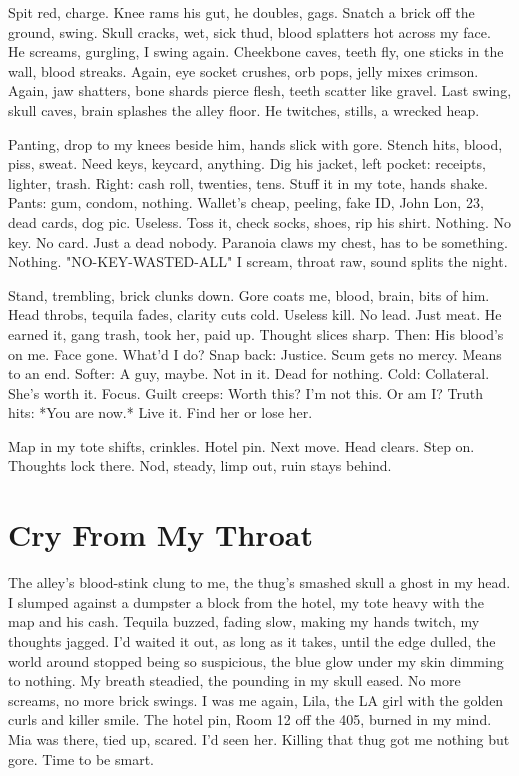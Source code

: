 \documentclass{article}
\begin{document}
Spit red, charge. Knee rams his gut, he doubles, gags. Snatch a brick off the ground, swing. Skull cracks, wet, sick thud, blood splatters hot across my face. He screams, gurgling, I swing again. Cheekbone caves, teeth fly, one sticks in the wall, blood streaks. Again, eye socket crushes, orb pops, jelly mixes crimson. Again, jaw shatters, bone shards pierce flesh, teeth scatter like gravel. Last swing, skull caves, brain splashes the alley floor. He twitches, stills, a wrecked heap.

Panting, drop to my knees beside him, hands slick with gore. Stench hits, blood, piss, sweat. Need keys, keycard, anything. Dig his jacket, left pocket: receipts, lighter, trash. Right: cash roll, twenties, tens. Stuff it in my tote, hands shake. Pants: gum, condom, nothing. Wallet's cheap, peeling, fake ID, John Lon, 23, dead cards, dog pic. Useless. Toss it, check socks, shoes, rip his shirt. Nothing. No key. No card. Just a dead nobody. Paranoia claws my chest, has to be something. Nothing. "NO-KEY-WASTED-ALL" I scream, throat raw, sound splits the night.

Stand, trembling, brick clunks down. Gore coats me, blood, brain, bits of him. Head throbs, tequila fades, clarity cuts cold. Useless kill. No lead. Just meat. He earned it, gang trash, took her, paid up. Thought slices sharp. Then: His blood's on me. Face gone. What'd I do? Snap back: Justice. Scum gets no mercy. Means to an end. Softer: A guy, maybe. Not in it. Dead for nothing. Cold: Collateral. She's worth it. Focus. Guilt creeps: Worth this? I'm not this. Or am I? Truth hits: *You are now.* Live it. Find her or lose her.

Map in my tote shifts, crinkles. Hotel pin. Next move. Head clears. Step on. Thoughts lock there. Nod, steady, limp out, ruin stays behind.

\section{Cry From My Throat}

The alley's blood-stink clung to me, the thug's smashed skull a ghost in my head. I slumped against a dumpster a block from the hotel, my tote heavy with the map and his cash. Tequila buzzed, fading slow, making my hands twitch, my thoughts jagged. I'd waited it out, as long as it takes, until the edge dulled, the world around stopped being so suspicious, the blue glow under my skin dimming to nothing. My breath steadied, the pounding in my skull eased. No more screams, no more brick swings. I was me again, Lila, the LA girl with the golden curls and killer smile. The hotel pin, Room 12 off the 405, burned in my mind. Mia was there, tied up, scared. I'd seen her. Killing that thug got me nothing but gore. Time to be smart.
\end{document}
